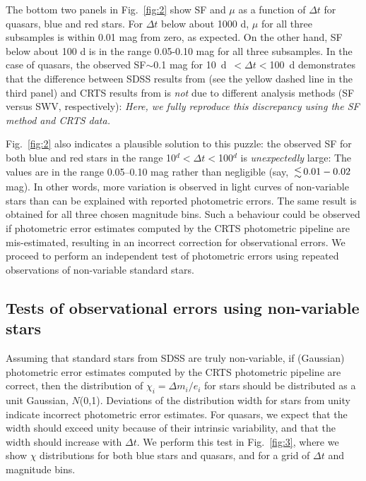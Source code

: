 \documentclass[fleqn,usenatbib]{mnras}
\begin{document}
The bottom two panels in Fig.~\ref{fig:2} show SF and $\mu$ as a function of $\Delta t$ for quasars, blue 
and red stars. For $\Delta t$ below about 1000 d, $\mu$ for all three subsamples is within 0.01 mag
from zero, as expected. On the other hand, SF below about 100 d is in the range 0.05-0.10 mag for
all three subsamples. In the case of quasars, the observed SF$\sim$0.1 mag for \mbox{10 d $<\Delta t<$100 d}
demonstrates that the difference between SDSS results from \cite{macleod2010} (see the yellow dashed
line in the third panel) and CRTS results from \cite{graham2014} is {\it not} due to different analysis 
methods (SF versus SWV, respectively): {\it Here, we fully reproduce this discrepancy using the SF method and 
CRTS data.} 

Fig.~\ref{fig:2} also indicates a plausible solution to this puzzle: the observed SF for both blue and red
stars in the range \mbox{10$^d<\Delta t<$100$^d$} is {\it unexpectedly} large: The values are in the range 
0.05--0.10 mag rather than negligible (say, $\la 0.01-0.02$ mag). In other words, more variation is 
observed in light curves of non-variable stars than can be explained with reported photometric errors.
The same result is obtained for all three chosen magnitude bins. Such a behaviour could be observed if 
photometric error estimates computed by the CRTS photometric pipeline are mis-estimated, resulting
in an incorrect correction for observational errors. We proceed to perform an independent test of 
photometric errors using repeated observations of non-variable standard stars. 


\subsection{Tests of observational errors using non-variable stars}
\label{sec:results}

Assuming that standard stars from SDSS are truly non-variable, if (Gaussian) photometric error estimates 
computed by the CRTS photometric pipeline are correct, then the distribution of $\chi_i= \Delta m_i / e_i$ 
for stars should be distributed as a unit Gaussian, $N$(0,1). Deviations of the distribution width for stars 
from unity indicate incorrect photometric error estimates. For quasars, we expect that the width should
exceed unity because of their intrinsic variability, and that the width should increase with $\Delta t$. 
We perform this test in Fig.~\ref{fig:3}, where we show $\chi$ distributions for both blue stars and quasars, 
and for a grid of $\Delta t$ and magnitude bins. 
\end{document}

